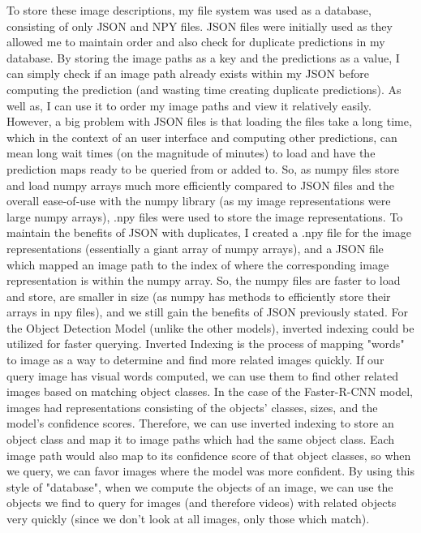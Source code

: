 \documentclass[10pt,twocolumn]{article}
\begin{document}
To store these image descriptions, my file system was used as a database, consisting of only JSON and NPY files. JSON files were initially used as they allowed me to maintain order and also check for duplicate predictions in my database. By storing the image paths as a key and the predictions as a value, I can simply check if an image path already exists within my JSON before computing the prediction (and wasting time creating duplicate predictions). As well as, I can use it to order my image paths and view it relatively easily. However, a big problem with JSON files is that loading the files take a long time, which in the context of an user interface and computing other predictions, can mean long wait times (on the magnitude of minutes) to load and have the prediction maps ready to be queried from or added to. So, as numpy files store and load numpy arrays much more efficiently compared to JSON files \cite{StackOverflow2016} and the overall ease-of-use with the numpy library (as my image representations were large numpy arrays), .npy files were used to store the image representations. To maintain the benefits of JSON with duplicates, I created a .npy file for the image representations (essentially a giant array of numpy arrays), and a JSON file which mapped an image path to the index of where the corresponding image representation is within the numpy array. So, the numpy files are faster to load and store, are smaller in size (as numpy has methods to efficiently store their arrays in npy files), and we still gain the benefits of JSON previously stated. For the Object Detection Model (unlike the other models), inverted indexing could be utilized for faster querying. Inverted Indexing is the process of mapping "words" to image as a way to determine and find more related images quickly. If our query image has visual words computed, we can use them to find other related images based on matching object classes. In the case of the Faster-R-CNN model, images had representations consisting of the objects' classes, sizes, and the model's confidence scores. Therefore, we can use inverted indexing to store an object class and map it to image paths which had the same object class. Each image path would also map to its confidence score of that object classes, so when we query, we can favor images where the model was more confident. By using this style of "database", when we compute the objects of an image, we can use the objects we find to query for images (and therefore videos) with related objects very quickly (since we don't look at all images, only those which match).
\end{document}
